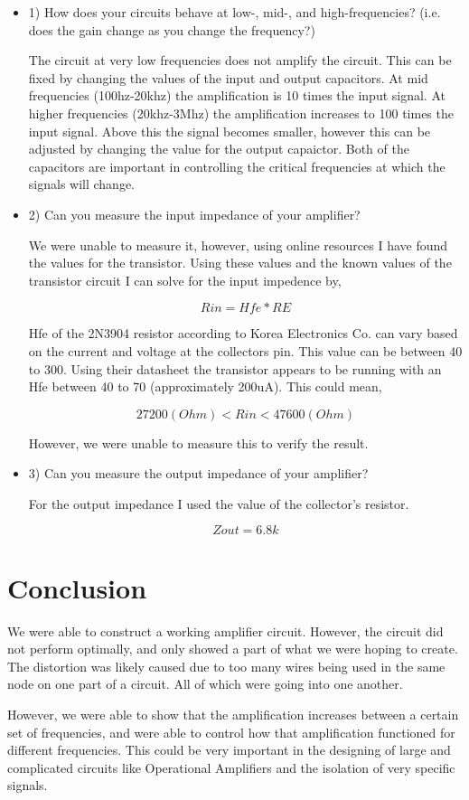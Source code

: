 \documentclass[a4paper]{article}
\begin{document}
\begin{itemize}
\item 1) How does your circuits behave at low-, mid-, and high-frequencies? (i.e.
does the gain change as you change the frequency?)

The circuit at very low frequencies does not amplify the circuit.  This can be fixed by changing the values of the input and output capacitors.  At mid frequencies (100hz-20khz) the amplification is 10 times the input signal.  At higher frequencies (20khz-3Mhz) the amplification increases to 100 times the input signal.  Above this the signal becomes smaller, however this can be adjusted by changing the value for the output capaictor.  Both of the capacitors are important in controlling the critical frequencies at which the signals will change.

\item 2) Can you measure the input impedance of your amplifier?

We were unable to measure it, however, using online resources I have found the values for the transistor.  Using these values and the known values of the transistor circuit I can solve for the input impedence by,

\[Rin= Hfe*RE\]

Hfe of the 2N3904 resistor according to Korea Electronics Co. can vary based on the current and voltage at the collectors pin.  This value can be between 40 to 300.  Using their datasheet the transistor appears to be running with an Hfe between 40 to 70 (approximately 200uA).  This could mean, 

\[27200(Ohm)<Rin<47600 (Ohm)\]

However, we were unable to measure this to verify the result.

\item 3) Can you measure the output impedance of your amplifier?

For the output impedance I used the value of the collector's resistor.  

\[Zout=6.8k\]

\end{itemize}

\section{Conclusion}

We were able to construct a working amplifier circuit.  However, the circuit did not perform optimally, and only showed a part of what we were hoping to create.  The distortion was likely caused due to too many wires being used in the same node on one part of a circuit.  All of which were going into one another.    

However, we were able to show that the amplification increases between a certain set of frequencies, and were able to control how that amplification functioned for different frequencies.  This could be very important in the designing of large and complicated circuits like Operational Amplifiers and the isolation of very specific signals.
\end{document}

